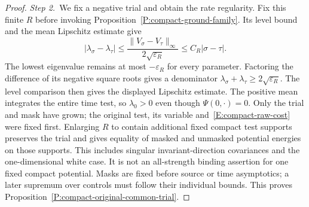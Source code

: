 \begin{proof}
  \medskip
  \noindent\textit{Step 2.~}We fix a negative trial and obtain the rate
  regularity.
  Fix this finite $R$ before invoking Proposition~\ref{P:compact-ground-family}.
  Its level bound and the mean Lipschitz estimate give
  \[
    |\lambda_\sigma-\lambda_\tau|
    \le\frac{\|V_\sigma-V_\tau\|_\infty}{2\sqrt{\varepsilon_R}}
    \le C_R|\sigma-\tau|.
  \]
  The lowest eigenvalue remains at most $-\varepsilon_R$ for every parameter.
  Factoring the difference of its negative square roots gives a denominator
  $\lambda_\sigma+\lambda_\tau \ge 2\sqrt{\varepsilon_R}$. The level
  comparison then gives the displayed Lipschitz estimate.
  The positive mean integrates the entire time test, so $\lambda_0 > 0$ even
  though $\Psi(0,\cdot) = 0$. Only the trial and mask have grown; the original
  test, its variable and~\eqref{E:compact-raw-cost} were fixed first. Enlarging
  $R$ to contain additional fixed compact test supports preserves the trial and
  gives equality of masked and unmasked potential energies on those supports.
  This includes singular invariant-direction covariances and the one-dimensional
  white case. It is not an all-strength binding assertion for one fixed compact
  potential. Masks are fixed before source or time asymptotics; a later supremum
  over controls must follow their individual bounds. This proves
  Proposition~\ref{P:compact-original-common-trial}.
\end{proof}
